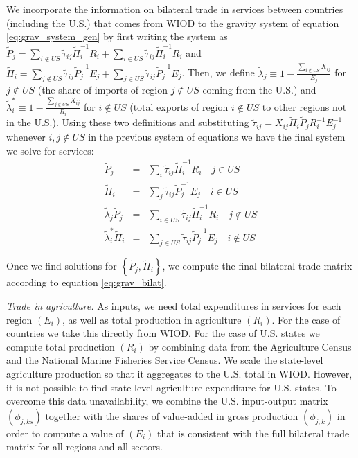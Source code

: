 \documentclass[12pt]{article}
\newcommand{\bs}{\small \begin{eqnarray*}}
\newcommand{\es}{\end{eqnarray*}}
\begin{document}
We incorporate the information on bilateral trade in services between countries (including the U.S.) that comes from WIOD to the gravity system of equation \eqref{eq:grav_system_gen} by first writing the system as $\tilde{P}_{j}  =  \sum_{i\notin US}\tilde{\tau}_{ij}\tilde{\Pi}_{i}^{-1}R_{i}+\sum_{i\in US}\tilde{\tau}_{ij}\tilde{\Pi}_{i}^{-1}R_{i}$ and $\tilde{\Pi}_{i}  =  \sum_{j\notin US}\tilde{\tau}_{ij}\tilde{P}_{j}^{-1}E_{j}+\sum_{j\in US}\tilde{\tau}_{ij}\tilde{P}_{j}^{-1}E_{j}$. Then, we define $\tilde{\lambda}_{j}\equiv1-\tfrac{\sum_{i\notin US}X_{ij}}{E_{j}}$ for $j\notin US$ (the share of imports of region $j\notin US$ coming from the U.S.) and $\tilde{\lambda}_{i}^{*}\equiv 1-\tfrac{\sum_{j\notin US}X_{ij}}{R_{i}}$ for $i\notin US$ (total exports of region $i\notin US$ to other regions not in the U.S.). Using these two definitions and substituting  $\tilde{\tau}_{ij}=X_{ij}\tilde{\Pi}_{i}\tilde{P}_{j}R_{i}^{-1}E_{j}^{-1}$ whenever $i,j \notin US$ in the previous system of equations we have the final system we solve for services:  
\bs
\tilde{P}_{j} & = & \sum_{i}\tilde{\tau}_{ij}\tilde{\Pi}_{i}^{-1}R_{i}\quad j\in US \\
\tilde{\Pi}_{i} & = &\sum_{j}\tilde{\tau}_{ij}\tilde{P}_{j}^{-1}E_{j}\quad i\in US \\
\tilde{\lambda}_{j}\tilde{P}_{j} & = & \sum_{i\in US}\tilde{\tau}_{ij}\tilde{\Pi}_{i}^{-1}R_{i}\quad j\notin US \\
\tilde{\lambda}_{i}^{*}\tilde{\Pi}_{i} & = & \sum_{j\in US}\tilde{\tau}_{ij}\tilde{P}_{j}^{-1}E_{j}\quad i\notin US
\es

Once we find solutions for  $\left\{ \tilde{P}_{j}, \tilde{\Pi}_{i} \right\}$, we compute the final bilateral trade matrix according to equation \eqref{eq:grav_bilat}.

\noindent \textit{{Trade in agriculture.}} As inputs, we need total expenditures in services for each region $(E_i)$, as well as total production in agriculture $(R_i)$. For the case of countries we take this directly from WIOD. For the case of U.S. states we compute total production $(R_i)$ by combining data from the Agriculture Census and the National Marine Fisheries Service Census. We scale the state-level agriculture production so that it aggregates to the U.S. total in WIOD. However, it is not possible to find state-level agriculture expenditure for U.S. states. To overcome this data unavailability, we combine the U.S. input-output matrix $(\phi_{j,ks})$ together with the shares of value-added in gross production $(\phi_{j,k})$ in order to compute a value of $(E_i)$ that is consistent with the full bilateral trade matrix for all regions and all sectors. 
\end{document}
